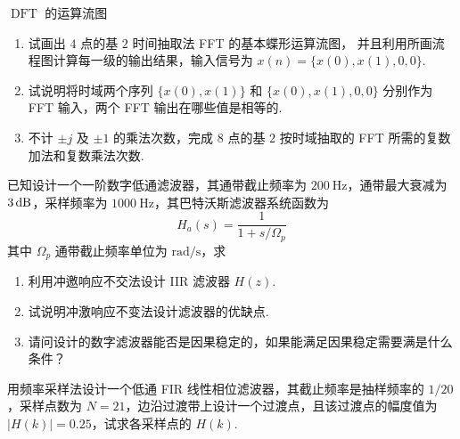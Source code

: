 \documentclass[quiet]{ctexart}
\DeclareMathOperator{\DFT}{DFT}
\begin{document}
\begin{problem}[14 pt]
  $\DFT$ 的运算流图
  \begin{center}
  \end{center}
  \begin{enumerate}
    \item 试画出 $4$ 点的基 $2$ 时间抽取法 FFT 的基本蝶形运算流图，
    并且利用所画流程图计算每一级的输出结果，输入信号为 $x(n) = \{x(0),x(1),0,0\}$.
    \item 试说明将时域两个序列 $\{x(0),x(1)\}$ 和 $\{x(0),x(1),0,0\}$
    分别作为 FFT 输入，两个 FFT 输出在哪些值是相等的.
    \item 不计 $\pm j$ 及 $\pm 1$ 的乘法次数，完成 $8$ 点的基 $2$ 按时域抽取的 FFT 所需的复数加法和复数乘法次数.
  \end{enumerate}
\end{problem}

\begin{problem}[12 pt]
  已知设计一个一阶数字低通滤波器，其通带截止频率为 $\qty{200}\Hz$，通带最大衰减为 $\qty3\dB$，采样频率为 $\qty{1000}\Hz$，其巴特沃斯滤波器系统函数为
  \[H_a(s) = \frac{1}{1 + s/\Omega_p}\]
  其中 $\Omega_p$ 通带截止频率单位为 $\unit{\radian/\s}$，求
  \begin{enumerate}
    \item 利用冲邀响应不交法设计 IIR 滤波器 $H(z)$.
    \item 试说明冲激响应不变法设计滤波器的优缺点.
    \item 请问设计的数字滤波器能否是因果稳定的，如果能满足因果稳定需要满是什么条件？
  \end{enumerate}
\end{problem}

\begin{problem}[10 pt]
  用频率采样法设计一个低通 FIR 线性相位滤波器，其截止频率是抽样频率的 $1/20$，采样点数为 $N = 21$，边沿过渡带上设计一个过渡点，且该过渡点的幅度值为 $|H(k)| = 0.25$，试求各采样点的 $H(k)$.
\end{problem}
\end{document}
